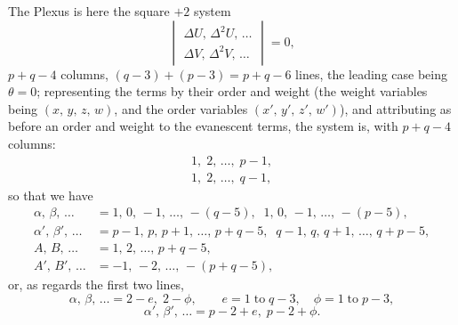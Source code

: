 \documentclass[11pt,a4paper]{article}
\begin{document}
The Plexus is here the square $+2$ system
\[
\begin{vmatrix}
\Delta U,\,\Delta^2 U,\,\ldots\\
\Delta V,\,\Delta^2 V,\,\ldots
\end{vmatrix} = 0,
\]
$p + q - 4$ columns, $(q-3) + (p-3) = p+q-6$ lines, the leading case being $\theta = 0$; representing the terms by their order and weight (the weight variables being $(x,\,y,\,z,\,w)$, and the order variables $(x',\,y',\,z',\,w')$), and attributing as before an order and weight to the evanescent terms, the system is, with $p+q-4$ columns:
\[
\begin{array}{l}
1,\;2,\,\ldots,\;p-1,\\
1,\;2,\,\ldots,\;q-1,
\end{array}
\]
so that we have
\begin{align*}
\alpha,\,\beta,\,\ldots &= 1,\,0,\,-1,\,\ldots,\,-(q-5),\;\;1,\,0,\,-1,\,\ldots,\,-(p-5),\\
\alpha',\,\beta',\,\ldots &= p-1,\,p,\,p+1,\,\ldots,\,p+q-5,\;\;q-1,\,q,\,q+1,\,\ldots,\,q+p-5,\\
A,\,B,\,\ldots &= 1,\,2,\,\ldots,\,p+q-5,\\
A',\,B',\,\ldots &= -1,\,-2,\,\ldots,\,-(p+q-5),
\end{align*}
or, as regards the first two lines,
\[
\alpha,\,\beta,\,\ldots = 2-e,\;2-\phi,\qquad e = 1\;\text{to}\;q-3,\quad\phi = 1\;\text{to}\;p-3,
\]
\[
\alpha',\,\beta',\,\ldots = p-2+e,\;p-2+\phi.
\]
\end{document}
